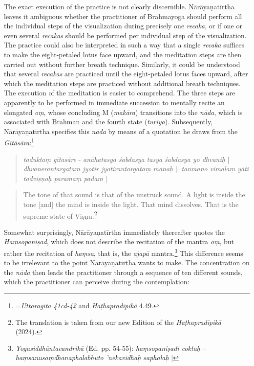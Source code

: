 The exact execution of the practice is not clearly discernible. Nārāyaṇatīrtha leaves it ambiguous whether the practitioner of Brahmayoga should perform all the individual steps of the visualization during precisely one \textit{recaka}, or if one or even several \textit{recakas} should be performed per individual step of the visualization. The practice could also be interpreted in such a way that a single \textit{recaka} suffices to make the eight-petaled lotus face upward, and the meditation steps are then carried out without further breath technique. Similarly, it could be understood that several \textit{recakas} are practiced until the eight-petaled lotus faces upward, after which the meditation steps are practiced without additional breath techniques.
The execution of the meditation is easier to comprehend. The three steps are apparently to be performed in immediate succession to mentally recite an elongated \textit{oṃ}, whose concluding M (\textit{makāra}) transitions into the \textit{nāda}, which is associated with Brahman and the fourth state (\textit{turīya}).
Subsequently, Nārāyaṇatīrtha specifies this \textit{nāda} by means of a quotation he draws from the \textit{Gītāsāra}:\footnote{=\textit{Uttaragīta 41cd-42} and \textit{Haṭhapradīpikā} 4.49.}

\begin{quote}
\textit{taduktaṃ gītasāre} -
\textit{anāhatasya śabdasya tasya śabdasya yo dhvaniḥ} |
\textit{dhvanerantargataṃ jyotir jyotirantargataṃ manaḥ} ||
\textit{tanmano vimalaṃ yāti tadviṣṇoḥ paramaṃ padam} |
\end{quote}
\begin{quote}
The tone of that sound is that of the unstruck sound. A light is inside the tone [and] the mind is inside the light. That mind dissolves. That is the supreme state of Viṣṇu.\footnote{The translation is taken from our new Edition of the \textit{Haṭhapradīpikā} (2024).}
  \end{quote}

  Somewhat surprisingly, Nārāyaṇatīrtha immediately thereafter quotes the \textit{Haṃsopaniṣad}, which does not describe the recitation of the mantra \textit{oṃ}, but rather the recitation of \textit{haṃsa}, that is, the \textit{ajapā} mantra.\footnote{\textit{Yogasiddhāntacandrikā} (Ed. pp. 54-55): \textit{haṃsopaniṣadi coktaḥ} – \textit{haṃsānusaṃdhānaphalabhūto 'nekavidhaḥ saphalaḥ} |} This difference seems to be irrelevant to the point Nārāyaṇatīrtha wants to make. The concentration on the \textit{nāda} then leads the practitioner through a sequence of ten different sounds, which the practitioner can perceive during the contemplation:
  
